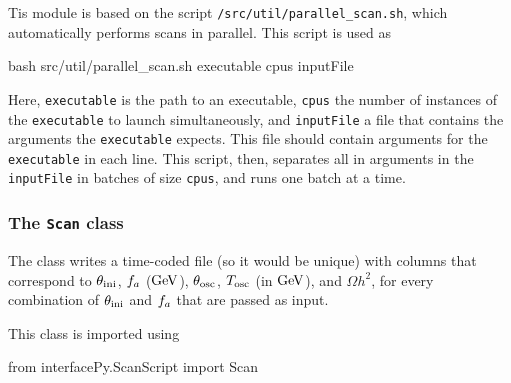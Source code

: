 \documentclass[11pt,a4paper]{article}
\begin{document}
Tis module is based on the  script {\tt \mimes/src/util/parallel\_scan.sh}, which automatically performs scans in parallel. This script is used as
%
\begin{py}
	bash src/util/parallel_scan.sh executable cpus inputFile
\end{py}  
%
Here, {\tt executable} is the path to an executable, {\tt cpus} the number of instances of the {\tt executable} to launch simultaneously, and {\tt inputFile} a file that contains the arguments the {\tt executable} expects. This file should contain arguments for the {\tt executable} in each line. This script, then, separates all in arguments in the {\tt inputFile} in batches of size {\tt cpus}, and runs one batch at a time.  


\subsubsection{The {\tt Scan} class}\label{app:Scan}
%
The  class writes a time-coded file (so it would be unique) with columns that correspond to $\theta_{\rm ini}{}$, $f_{a}{}$ (${\rm GeV}$), $\theta_{\rm osc}{}$, $T_{\rm osc}{}$ (in ${\rm GeV}$), and $\Omega h^2$, for every combination of $\theta_{\rm ini}{}$ and $f_{a}{}$ that are passed as input. 

This class is imported using 
%
\begin{py}
	from interfacePy.ScanScript import Scan
\end{py}
\end{document}
